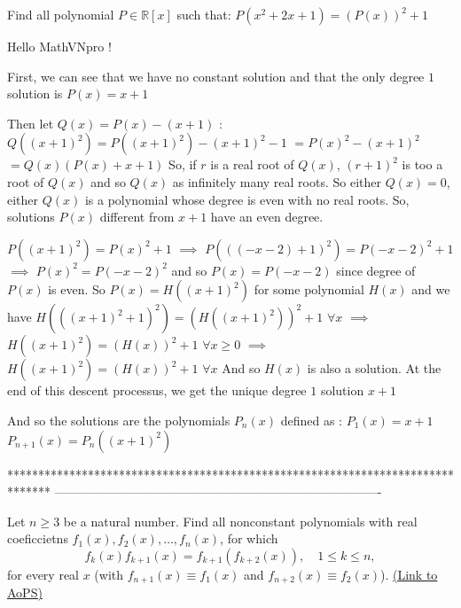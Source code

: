 \begin{solution}
	\begin{tcolorbox}Find all polynomial $ P\in \mathbb {R}[x]$ such that: $ P(x^2 + 2x + 1) = (P(x))^2 + 1$\end{tcolorbox}

Hello MathVNpro !

First, we can see that we have no constant solution and that the only degree $ 1$ solution is $ P(x) = x + 1$

Then let $ Q(x) = P(x) - (x + 1)$ : $ Q((x + 1)^2) = P((x + 1)^2) - (x + 1)^2 - 1$ $ = P(x)^2 - (x + 1)^2$ $ = Q(x)(P(x) + x + 1)$
So, if $ r$ is a real root of $ Q(x)$, $ (r + 1)^2$ is too a root of $ Q(x)$ and so $ Q(x)$ as infinitely many real roots.
So either $ Q(x) = 0$, either $ Q(x)$ is a polynomial whose degree is even with no real roots.
So, solutions $ P(x)$ different from $ x + 1$ have an even degree.

$ P((x + 1)^2) = P(x)^2 + 1$ $ \implies$ $ P((( - x - 2) + 1)^2) = P( - x - 2)^2 + 1$ $ \implies$ $ P(x)^2 = P( - x - 2)^2$ and so $ P(x) = P( - x - 2)$ since degree of $ P(x)$ is even.
So $ P(x) = H((x + 1)^2)$ for some polynomial $ H(x)$ and we have $ H(((x + 1)^2 + 1)^2) = (H((x + 1)^2))^2 + 1$ $ \forall x$
$ \implies$ $ H((x + 1)^2) = (H(x))^2 + 1$ $ \forall x\geq 0$
$ \implies$ $ H((x + 1)^2) = (H(x))^2 + 1$ $ \forall x$
And so $ H(x)$ is also a solution.
At the end of this descent processus, we get the unique degree $ 1$ solution $ x + 1$

And so the solutions are the polynomials $ P_n(x)$ defined as :
$ P_1(x) = x + 1$
$ P_{n + 1}(x) = P_n((x + 1)^2)$
\end{solution}
*******************************************************************************
-------------------------------------------------------------------------------

\begin{problem}
	Let $ n\ge 3$ be a natural number. Find all nonconstant polynomials with real coeficcietns $ f_{1}\left(x\right),f_{2}\left(x\right),\ldots,f_{n}\left(x\right)$, for which
\[ f_{k}\left(x\right)f_{k+ 1}\left(x\right) = f_{k +1}\left(f_{k + 2}\left(x\right)\right), \quad  1\le k\le n,\]
for every real $ x$ (with $ f_{n +1}\left(x\right)\equiv f_{1}\left(x\right)$ and $ f_{n + 2}\left(x\right)\equiv f_{2}\left(x\right)$).
	\flushright \href{https://artofproblemsolving.com/community/c6h283701}{(Link to AoPS)}
\end{problem}



